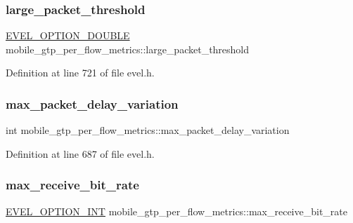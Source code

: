 \subsubsection{\texorpdfstring{large\+\_\+packet\+\_\+threshold}{large\_packet\_threshold}}
{\footnotesize\ttfamily \hyperlink{evel_8h_aafc42b3cd9aca88804c3d413e4ccec06}{E\+V\+E\+L\+\_\+\+O\+P\+T\+I\+O\+N\+\_\+\+D\+O\+U\+B\+LE} mobile\+\_\+gtp\+\_\+per\+\_\+flow\+\_\+metrics\+::large\+\_\+packet\+\_\+threshold}



Definition at line 721 of file evel.\+h.

\hypertarget{structmobile__gtp__per__flow__metrics_a55f37ade16fb28661f2f333f3f1e8883}{}\label{structmobile__gtp__per__flow__metrics_a55f37ade16fb28661f2f333f3f1e8883} 
\subsubsection{\texorpdfstring{max\+\_\+packet\+\_\+delay\+\_\+variation}{max\_packet\_delay\_variation}}
{\footnotesize\ttfamily int mobile\+\_\+gtp\+\_\+per\+\_\+flow\+\_\+metrics\+::max\+\_\+packet\+\_\+delay\+\_\+variation}



Definition at line 687 of file evel.\+h.

\hypertarget{structmobile__gtp__per__flow__metrics_a512b5e3eced30bb9db9f38e8cc83b5f4}{}\label{structmobile__gtp__per__flow__metrics_a512b5e3eced30bb9db9f38e8cc83b5f4} 
\subsubsection{\texorpdfstring{max\+\_\+receive\+\_\+bit\+\_\+rate}{max\_receive\_bit\_rate}}
{\footnotesize\ttfamily \hyperlink{evel_8h_a452d825778d1c2368a54b8f689a25ba7}{E\+V\+E\+L\+\_\+\+O\+P\+T\+I\+O\+N\+\_\+\+I\+NT} mobile\+\_\+gtp\+\_\+per\+\_\+flow\+\_\+metrics\+::max\+\_\+receive\+\_\+bit\+\_\+rate}




